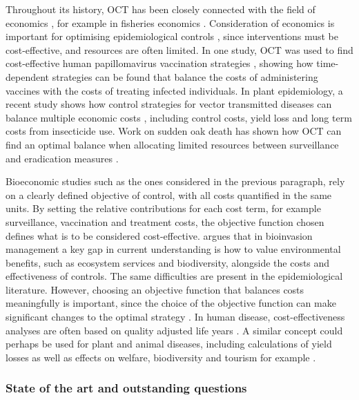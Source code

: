 Throughout its history, OCT has been closely connected with the field of economics \citep{weber_optimal_2011}, for example in fisheries economics \citep{clark_economics_1975}. Consideration of economics is important for optimising epidemiological controls \citep{perrings_merging_2014}, since interventions must be cost-effective, and resources are often limited. In one study, OCT was used to find cost-effective human papillomavirus vaccination strategies \citep{brown_role_2011}, showing how time-dependent strategies can be found that balance the costs of administering vaccines with the costs of treating infected individuals. In plant epidemiology, a recent study shows how control strategies for vector transmitted diseases can balance multiple economic costs \citep{bokil_optimal_2019}, including control costs, yield loss and long term costs from insecticide use. Work on sudden oak death has shown how OCT can find an optimal balance when allocating limited resources between surveillance and eradication measures \citep{ndeffo_mbah_balancing_2010}.

Bioeconomic studies such as the ones considered in the previous paragraph, rely on a clearly defined objective of control, with all costs quantified in the same units. By setting the relative contributions for each cost term, for example surveillance, vaccination and treatment costs, the objective function chosen defines what is to be considered cost-effective. \citet{epanchin-niell_economics_2017} argues that in bioinvasion management a key gap in current understanding is how to value environmental benefits, such as ecosystem services and biodiversity, alongside the costs and effectiveness of controls. The same difficulties are present in the epidemiological literature. However, choosing an objective function that balances costs meaningfully is important, since the choice of the objective function can make significant changes to the optimal strategy \citep{probert_decision_2016}. In human disease, cost-effectiveness analyses are often based on quality adjusted life years \citep{whitehead_health_2010}. A similar concept could perhaps be used for plant and animal diseases, including calculations of yield losses \citep{savary_crop_2012, savary_global_2019} as well as effects on welfare, biodiversity and tourism for example \citep{boyd_consequence_2013}.

\subsubsection{State of the art and outstanding questions}

